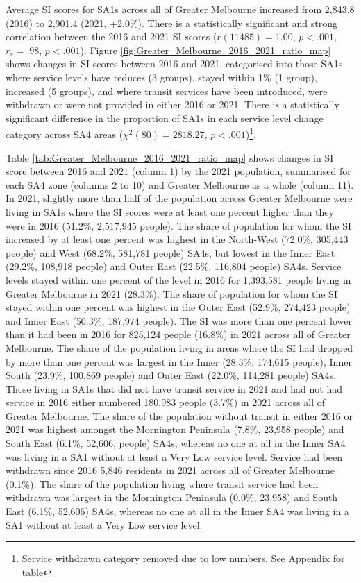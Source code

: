 \documentclass[preprint, 3p,
authoryear]{elsarticle} %
\begin{document}
Average SI scores for SA1s across all of Greater Melbourne increased
from 2,843.8 (2016) to 2,901.4 (2021, +2.0\%). There is a statistically
significant and strong correlation between the 2016 and 2021 SI scores
(\(r(11485) = 1.00\), \(p < .001\), \(r_s =.98\), \(p < .001\)). Figure
\ref{fig:Greater_Melbourne_2016_2021_ratio_map} shows changes in SI
scores between 2016 and 2021, categorised into those SA1s where service
levels have reduces (3 groups), stayed within 1\% (1 group), increased
(5 groups), and where transit services have been introduced, were
withdrawn or were not provided in either 2016 or 2021. There is a
statistically significant difference in the proportion of SA1s in each
service level change category across SA4 areas
(\(\chi^2(80) = 2818.27\), \(p < .001\))\footnote{Service withdrawn
  category removed due to low numbers. See Appendix for table}.

Table \ref{tab:Greater_Melbourne_2016_2021_ratio_map} shows changes in
SI score between 2016 and 2021 (column 1) by the 2021 population,
summarised for each SA4 zone (columns 2 to 10) and Greater Melbourne as
a whole (column 11). In 2021, slightly more than half of the population
across Greater Melbourne were living in SA1s where the SI scores were at
least one percent higher than they were in 2016 (51.2\%, 2,517,945
people). The share of population for whom the SI increased by at least
one percent was highest in the North-West (72.0\%, 305,443 people) and
West (68.2\%, 581,781 people) SA4s, but lowest in the Inner East
(29.2\%, 108,918 people) and Outer East (22.5\%, 116,804 people) SA4s.
Service levels stayed within one percent of the level in 2016 for
1,393,581 people living in Greater Melbourne in 2021 (28.3\%). The share
of population for whom the SI stayed within one percent was highest in
the Outer East (52.9\%, 274,423 people) and Inner East (50.3\%, 187,974
people). The SI was more than one percent lower than it had been in 2016
for 825,124 people (16.8\%) in 2021 across all of Greater Melbourne. The
share of the population living in areas where the SI had dropped by more
than one percent was largest in the Inner (28.3\%, 174,615 people),
Inner South (23.9\%, 100,869 people) and Outer East (22.0\%, 114,281
people) SA4s. Those living in SA1s that did not have transit service in
2021 and had not had service in 2016 either numbered 180,983 people
(3.7\%) in 2021 across all of Greater Melbourne. The share of the
population without transit in either 2016 or 2021 was highest amongst
the Mornington Peninsula (7.8\%, 23,958 people) and South East (6.1\%,
52,606, people) SA4s, whereas no one at all in the Inner SA4 was living
in a SA1 without at least a Very Low service level. Service had been
withdrawn since 2016 5,846 residents in 2021 across all of Greater
Melbourne (0.1\%). The share of the population living where transit
service had been withdrawn was largest in the Mornington Peninsula
(0.0\%, 23,958) and South East (6.1\%, 52,606) SA4s, whereas no one at
all in the Inner SA4 was living in a SA1 without at least a Very Low
service level.
\end{document}
